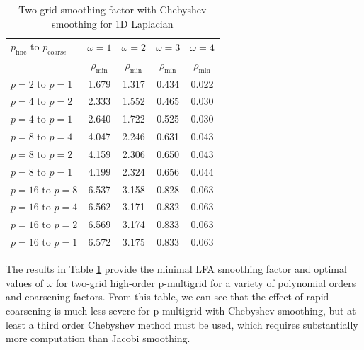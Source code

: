 \documentclass[review]{siamart190516}
\begin{document}
\begin{table}[ht!]
\begin{center}
\begin{tabular}{l c c c c}
  \toprule
  $p_{\text{fine}}$ to $p_{\text{coarse}}$  &  $\omega = 1$   &  $\omega = 2$   &  $\omega = 3$   &  $\omega = 4$   \\
                                            &  $\rho_{\min}$  &  $\rho_{\min}$  &  $\rho_{\min}$  &  $\rho_{\min}$  \\
  \midrule
  $p = 2$ to $p = 1$          &  1.679  &  1.317  &  0.434  &  0.022  \\
  $p = 4$ to $p = 2$          &  2.333  &  1.552  &  0.465  &  0.030  \\
  $p = 4$ to $p = 1$          &  2.640  &  1.722  &  0.525  &  0.030  \\
  $p = 8$ to $p = 4$          &  4.047  &  2.246  &  0.631  &  0.043  \\
  $p = 8$ to $p = 2$          &  4.159  &  2.306  &  0.650  &  0.043  \\
  $p = 8$ to $p = 1$          &  4.199  &  2.324  &  0.656  &  0.044  \\
  $p = 16$ to $p = 8$         &  6.537  &  3.158  &  0.828  &  0.063  \\
  $p = 16$ to $p = 4$         &  6.562  &  3.171  &  0.832  &  0.063  \\
  $p = 16$ to $p = 2$         &  6.569  &  3.174  &  0.833  &  0.063  \\
  $p = 16$ to $p = 1$         &  6.572  &  3.175  &  0.833  &  0.063  \\
  \bottomrule
\end{tabular}
\end{center}
\caption{Two-grid smoothing factor with Chebyshev smoothing for 1D Laplacian}
\label{table:two_grid_1d_chebyshev}
\end{table}

The results in Table \ref{table:two_grid_1d_chebyshev} provide the minimal LFA smoothing factor and optimal values of $\omega$ for two-grid high-order p-multigrid for a variety of polynomial orders and coarsening factors.
From this table, we can see that the effect of rapid coarsening is much less severe for p-multigrid with Chebyshev smoothing, but at least a third order Chebyshev method must be used, which requires substantially more computation than Jacobi smoothing.

\end{document}
